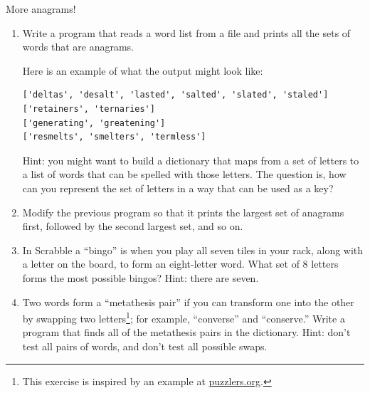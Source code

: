 \documentclass[10pt]{book}
\begin{document}
\begin{ex}
\label{anagrams}


More anagrams!

\begin{enumerate}

\item Write a program
that reads a word list from a file and
prints all the sets of words that are anagrams.

Here is an example of what the output might look like:

\beforeverb
\begin{verbatim}
['deltas', 'desalt', 'lasted', 'salted', 'slated', 'staled']
['retainers', 'ternaries']
['generating', 'greatening']
['resmelts', 'smelters', 'termless']
\end{verbatim}
\afterverb
%
Hint: you might want to build a dictionary that maps from a
set of letters to a list of words that can be spelled with those
letters.  The question is, how can you represent the set of
letters in a way that can be used as a key?

\item Modify the previous program so that it prints the largest set
of anagrams first, followed by the second largest set, and so on.


\item In Scrabble a ``bingo'' is when you play all seven tiles in
your rack, along with a letter on the board, to form an eight-letter
word.  What set of 8 letters forms the most possible bingos?
Hint: there are seven.



\item Two words form a ``metathesis pair'' if you can transform one
  into the other by swapping two letters\footnote{This exercise is
    inspired by an example at \url{puzzlers.org}.}; for example,
  ``converse'' and ``conserve.''  Write a program that finds all of
  the metathesis pairs in the dictionary.  Hint: don't test all pairs
  of words, and don't test all possible swaps.
% 
% 
\end{enumerate}
\end{ex}
\end{document}
